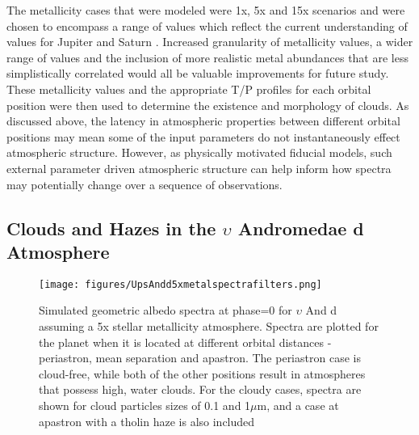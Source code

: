 \documentclass[12pt, letterpaper]{aastex631}
\begin{document}
The metallicity cases that were modeled were 1x, 5x and 15x scenarios and were chosen to encompass a range of values which reflect the current understanding of values for Jupiter and Saturn \citep{2016arXiv160604510A}.  Increased granularity of metallicity values, a wider range of values and the inclusion of more realistic metal abundances that are less simplistically correlated would all be valuable improvements for future study.  These metallicity values and the appropriate T/P profiles for each orbital position were then used to determine the existence and morphology of clouds.  As discussed above, the latency in atmospheric properties between different orbital positions may mean some of the input parameters do not instantaneously effect atmospheric structure.  However, as physically motivated fiducial models, such external parameter driven atmospheric structure can help inform how spectra may potentially change over a sequence of observations.  

\subsection{Clouds and Hazes in the $\upsilon$ Andromedae d Atmosphere} \label{subsec:cloudshazes}

 \begin{figure*}[t]
  \centering
  \texttt{[image: figures/UpsAndd5xmetalspectrafilters.png]}
  \caption{Simulated geometric albedo spectra at phase=0 for $\upsilon$ And d assuming a 5x stellar metallicity atmosphere.  Spectra are plotted for the planet when it is located at different orbital distances - periastron, mean separation and apastron.  The periastron case is cloud-free, while both of the other positions result in atmospheres that possess high, water clouds.  For the cloudy cases, spectra are shown for cloud particles sizes of 0.1 and 1\;$\mu$m, and a case at apastron with a tholin haze is also included}
  \label{fig:UpsAndd5xmetalcases}
\end{figure*}
\end{document}
